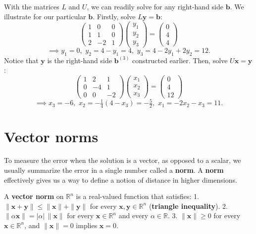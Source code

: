 \documentclass[
  letterpaper,
  DIV=11,
  numbers=noendperiod]{scrreprt}
\newenvironment{fbxSimple}[3]{\begin{tcolorbox}[enhanced, breakable,%
attach boxed title to top*={xshift=1.4pt},
boxed title style={boxrule=0.0mm, fuzzy shadow={1pt}{-1pt}{0mm}{0.1mm}{gray}, arc=.3em, rounded corners=east, sharp corners=west}, colframe=#1-color2, colbacktitle=#1-color1, colback = white, coltitle=black,  titlerule=0mm, toprule=0pt, bottomrule=.7pt, leftrule=.3em, rightrule=.7pt, outer arc=.3em,  	left=.5em, right=.5em, bottomtitle=1mm, toptitle=1mm,title=\textbf{#2}\hspace{0.5em}{#3}]}
{\end{tcolorbox}}
\begin{document}
\begin{fbxSimple}{eg}{Example 3.6}{}
With the matrices \(L\) and \(U\), we can readily solve for any
right-hand side \(\mathbf{b}\). We illustrate for our particular
\(\mathbf{b}\). Firstly, solve \(L\mathbf{y}=\mathbf{b}\): \[
\begin{pmatrix}
1 & 0 & 0\\
1 & 1 & 0\\
2 & -2 & 1
\end{pmatrix}
\begin{pmatrix}
y_1\\y_2\\y_3
\end{pmatrix}
=
\begin{pmatrix}
0\\ 4\\ 4
\end{pmatrix}
\] \[
\implies y_1 = 0, \,\, y_2 = 4-y_1 =4, \,\, y_3=4-2y_1+2y_2 = 12.
\] Notice that \(\mathbf{y}\) is the right-hand side
\(\mathbf{b}^{(3)}\) constructed earlier. Then, solve
\(U\mathbf{x} = \mathbf{y}\): \[
\begin{pmatrix}
1 & 2 & 1\\
0 & -4 & 1\\
0 & 0 & -2
\end{pmatrix}
\begin{pmatrix}
x_1\\x_2\\x_3
\end{pmatrix}=
\begin{pmatrix}
0\\4\\12
\end{pmatrix}
\] \[
\implies x_3 = -6, \,\, x_2=-\tfrac14(4-x_3)=-\tfrac52, \,\, x_1 = -2x_2 - x_3 = 11.
\]

\end{fbxSimple}

\section{Vector norms}\label{vector-norms}

To measure the error when the solution is a vector, as opposed to a
scalar, we usually summarize the error in a single number called a
\textbf{norm}. A \textbf{norm} effectively gives us a way to define a
notion of distance in higher dimensions.

A \textbf{vector norm} on \(\mathbb{R}^n\) is a real-valued function
that satisfies: 1.
\(\|\mathbf{x} + \mathbf{y}\| \leq \|\mathbf{x}\| + \|\mathbf{y}\|\) for
every \(\mathbf{x},\mathbf{y}\in \mathbb{R}^n\) (\textbf{triangle
inequality}). 2. \(\|\alpha \mathbf{x}\| = |\alpha|\,\|\mathbf{x}\|\)
for every \(\mathbf{x}\in \mathbb{R}^n\) and every
\(\alpha\in\mathbb{R}\). 3. \(\|\mathbf{x}\| \geq 0\) for every
\(\mathbf{x}\in \mathbb{R}^n\), and \(\|\mathbf{x}\|=0\) implies
\(\mathbf{x}=0\).
\end{document}
